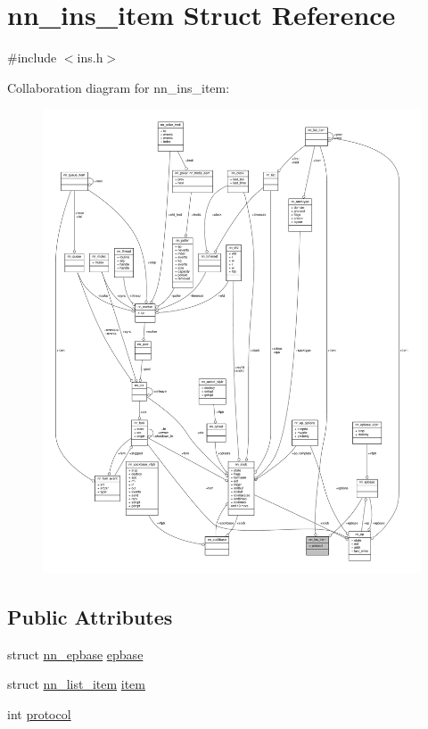 \hypertarget{structnn__ins__item}{}\section{nn\+\_\+ins\+\_\+item Struct Reference}
\label{structnn__ins__item}


{\ttfamily \#include $<$ins.\+h$>$}



Collaboration diagram for nn\+\_\+ins\+\_\+item\+:\nopagebreak
\begin{figure}[H]
\begin{center}
\leavevmode
\includegraphics[width=350pt]{structnn__ins__item__coll__graph}
\end{center}
\end{figure}
\subsection*{Public Attributes}
\begin{DoxyCompactItemize}
\item 
struct \hyperlink{structnn__epbase}{nn\+\_\+epbase} \hyperlink{structnn__ins__item_a15a0b556b4f83f7e6e56100240ba447e}{epbase}
\item 
struct \hyperlink{structnn__list__item}{nn\+\_\+list\+\_\+item} \hyperlink{structnn__ins__item_a4bd16a4e13b6fdf31dd4676765c546ef}{item}
\item 
int \hyperlink{structnn__ins__item_a4b7d1b078f05bf6940b8df04dbf50483}{protocol}
\end{DoxyCompactItemize}


